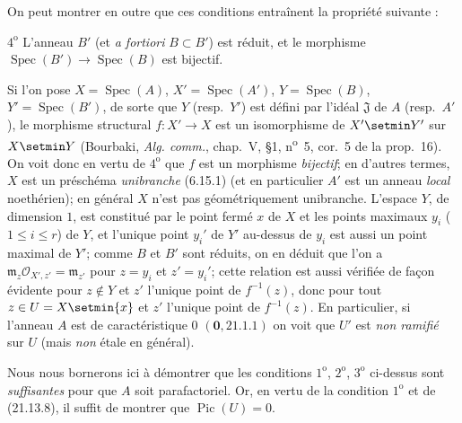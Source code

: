 \begin{examples}[21.13.9]
On peut montrer en outre que ces conditions entraînent la propriété suivante :

$4^{\mathrm o}$ L'anneau $B'$ (et \emph{a fortiori} $B\subset B'$) est réduit, et le
morphisme $\operatorname{Spec}(B')\to\operatorname{Spec}(B)$ est bijectif.

Si l'on pose $X=\operatorname{Spec}(A)$, $X'=\operatorname{Spec}(A')$,
$Y=\operatorname{Spec}(B)$, $Y'=\operatorname{Spec}(B')$, de sorte que $Y$
(resp.\ $Y'$) est défini par l'idéal $\mathfrak J$ de $A$ (resp.\ $A'$), le morphisme
structural $f:X'\to X$ est un isomorphisme de $X'\setmin Y'$ sur $X\setmin Y$ (Bourbaki,
\emph{Alg. comm.}, chap.~V, \S1, n\textsuperscript{o}~5, cor.~5 de la prop.~16). On
voit donc en vertu de $4^{\mathrm o}$ que $f$ est un morphisme \emph{bijectif}; en
d'autres termes, $X$ est un préschéma \emph{unibranche} (6.15.1) (et en particulier
$A'$ est un anneau \emph{local} noethérien); en général $X$ n'est pas géométriquement
unibranche. L'espace $Y$, de dimension $1$, est constitué par le point fermé $x$ de
$X$ et les points maximaux $y_i$ ($1\leq i\leq r$) de $Y$, et l'unique point $y_i'$
de $Y'$ au-dessus de $y_i$ est aussi un point maximal de $Y'$; comme $B$ et $B'$ sont
réduits, on en déduit que l'on a $\mathfrak m_z\mathcal O_{X',z'}=\mathfrak m_{z'}$
pour $z=y_i$ et $z'=y_i'$; cette relation est aussi vérifiée de façon évidente pour
$z\notin Y$ et $z'$ l'unique point de $f^{-1}(z)$, donc pour tout
$z\in U=X\setmin\{x\}$ et $z'$ l'unique point de $f^{-1}(z)$. En particulier, si l'anneau
$A$ est de caractéristique $0$ $(\mathbf 0, 21.1.1)$ on voit que $U'$ est \emph{non ramifié} sur
$U$ (mais \emph{non} étale en général).

Nous nous bornerons ici à démontrer que les conditions $1^{\mathrm o}$,
$2^{\mathrm o}$, $3^{\mathrm o}$ ci-dessus sont \emph{suffisantes} pour que $A$ soit
parafactoriel. Or, en vertu de la condition $1^{\mathrm o}$ et de (21.13.8), il suffit
de montrer que $\operatorname{Pic}(U)=0$.


\end{examples}
